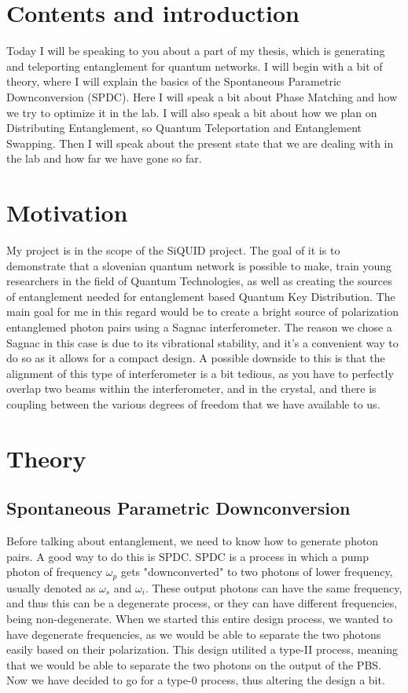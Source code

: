 \documentclass{article}
\begin{document}
\section{Contents and introduction}
Today I will be speaking to you about a part of my thesis, which is generating and teleporting entanglement for quantum networks. I will begin with a bit of theory,
where I will explain the basics of the Spontaneous Parametric Downconversion (SPDC). Here I will speak a bit about Phase Matching and how we try to optimize it in the lab. I will also
speak a bit about how we plan on Distributing Entanglement, so Quantum Teleportation and Entanglement Swapping.
Then I will speak about the present state that we are dealing with in the lab and how far we have gone so far.

\section{Motivation}
My project is in the scope of the SiQUID project. The goal of it is to demonstrate that a slovenian quantum network is possible to make,
train young researchers in the field of Quantum Technologies, as well as creating the sources of entanglement needed for entanglement based Quantum Key Distribution.
The main goal for me in this regard would be to create a bright source of polarization entanglemed photon pairs using a Sagnac interferometer.
The reason we chose a Sagnac in this case is due to its vibrational stability, and it's a convenient way to do so as it allows for a compact design.
A possible downside to this is that the alignment of this type of interferometer is a bit tedious, as you have to perfectly overlap two beams within the interferometer,
and in the crystal, and there is coupling between the various degrees of freedom that we have available to us.

\section{Theory}
\subsection{Spontaneous Parametric Downconversion}
Before talking about entanglement, we need to know how to generate photon pairs. A good way to do this is SPDC.
SPDC is a process in which a pump photon of frequency $\omega_p$ gets "downconverted" to two photons of lower frequency,
usually denoted as $\omega_s$ and $\omega_i$. These output photons can have the same frequency,
and thus this can be a degenerate process, or they can have different frequencies, being non-degenerate.
When we started this entire design process, we wanted to have degenerate frequencies, as we would be able to separate
the two photons easily based on their polarization. This design utilited a type-II process, meaning that we would be able 
to separate the two photons on the output of the PBS. Now we have decided to go for a type-0 process, thus altering the design a bit.
\end{document}
